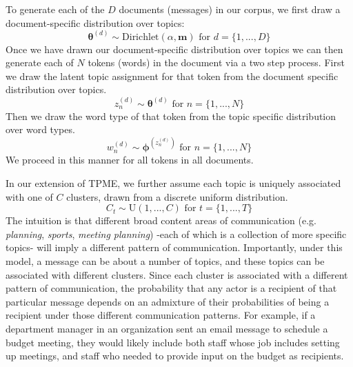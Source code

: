\documentclass{pnastwo}
\begin{document}
\begin{article}
To generate each of the $D$ documents (messages) in our corpus, we first draw a document-specific distribution over topics:
\begin{equation}
	\boldsymbol{\theta}^{(d)} \sim \text{Dirichlet}(\alpha,\boldsymbol{m}) \text{ for } d = \{1,...,D\}
\end{equation}
Once we have drawn our document-specific distribution over topics we can then generate each of $N$ tokens (words) in the document via a two step process. First we draw the latent topic assignment for that token from the document specific distribution over topics.
\begin{equation}
	z_n^{(d)} \sim \boldsymbol{\theta}^{(d)} \text{ for } n = \{1,...,N\}
\end{equation}
 Then we draw the word type of that token from the topic specific distribution over word types.
 \begin{equation}
 	w_n^{(d)} \sim \boldsymbol{\phi}^{(z_n^{(d)})} \text{ for } n = \{1,...,N\}
 \end{equation}
We proceed in this manner for all tokens in all documents. 


In our extension of TPME, we further assume each topic is uniquely associated with one of $C$ clusters, drawn from a discrete uniform distribution.
\begin{equation}
	C_t \sim \text{U}(1,...,C) \text{ for } t = \{1, ..., T\}
\end{equation}
The intuition is that different broad content areas of communication (e.g. \emph{planning}, \emph{sports}, \emph{meeting planning}) -each of which is a collection of more specific topics- will imply a different pattern of communication. Importantly, under this model, a message can be about a number of topics, and these topics can be associated with different clusters. Since each cluster is associated with a different pattern of communication, the probability that any actor is a recipient of that particular message depends on an admixture of their probabilities of being a recipient under those different communication patterns. For example, if a department manager in an organization sent an email message to schedule a budget meeting, they would likely include both staff whose job includes setting up meetings, and staff who needed to provide input on the budget as recipients. 


\end{article}
\end{document}
